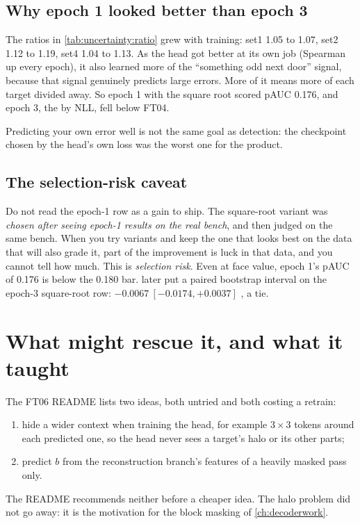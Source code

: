 \subsection{Why epoch 1 looked better than epoch 3}

The ratios in \cref{tab:uncertainty:ratio} grew with training: set1 1.05 to 1.07, set2 1.12 to 1.19, set4 1.04
to 1.13. As the head got better at its own job (Spearman up every epoch), it also learned more of the
``something odd next door'' signal, because that signal genuinely predicts large errors. More of it means more
of each target divided away. So epoch 1 with the square root scored pAUC 0.176, and epoch 3, the
 by NLL, fell below FT04.

\begin{keypoint}
Predicting your own error well is not the same goal as detection: the checkpoint chosen by the head's own
loss was the worst one for the product.
\end{keypoint}

\subsection{The selection-risk caveat}

Do not read the epoch-1 row as a gain to ship. The square-root variant was \emph{chosen after seeing epoch-1
results on the real bench}, and then judged on the same bench. When you try variants and keep the one that
looks best on the data that will also grade it, part of the improvement is luck in that data, and you cannot
tell how much. This is \emph{selection risk}. Even at face value, epoch 1's pAUC of 0.176
is below the 0.180 bar.  later put a paired bootstrap interval on the epoch-3 square-root
row: $-0.0067\ [-0.0174, +0.0037]$ , a tie.

\section{What might rescue it, and what it taught}\label{sec:uncertainty:rescue}

The FT06 README lists two ideas, both untried and both costing a retrain:
\begin{enumerate}
\item hide a wider context when training the head, for example $3\times3$ tokens around each predicted one, so
  the head never sees a target's halo or its other parts;
\item predict $b$ from the reconstruction branch's features of a heavily masked pass only.
\end{enumerate}
The README recommends neither before a cheaper idea. The halo problem did not go away: it is the motivation
for the block masking of \cref{ch:decoderwork}.

